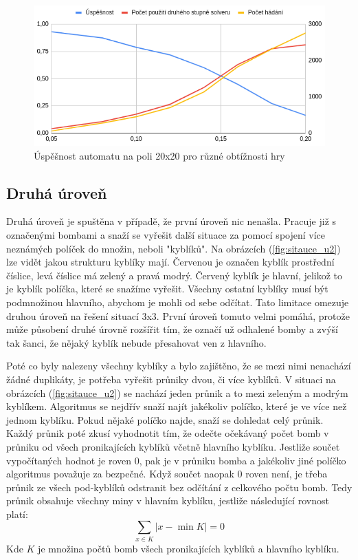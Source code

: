 \begin{figure}[ht!]
    \centering
    \includegraphics[scale=0.60]{images/uspesnost.png}
    \caption{Úspěšnost automatu na poli 20x20 pro různé obtížnosti hry}
    \label{fig:uspesnost}
\end{figure}

\subsection{Druhá úroveň}
Druhá úroveň je spuštěna v případě, že první úroveň nic nenašla. Pracuje již s označenými bombami a snaží se vyřešit další
situace za pomocí spojení více neznámých políček do množin, neboli "kyblíků". Na obrázcích (\ref{fig:sitauce_u2}) lze vidět jakou
strukturu kyblíky mají. Červenou je označen kyblík prostřední číslice, levá číslice má zelený a pravá modrý. Červený kyblík je
hlavní, jelikož to je kyblík políčka, které se snažíme vyřešit. Všechny ostatní kyblíky musí být podmnožinou hlavního, abychom je
mohli od sebe odčítat. Tato limitace omezuje druhou úroveň na řešení situací 3x3. První úroveň tomuto velmi pomáhá, protože může
působení druhé úrovně rozšířit tím, že označí už odhalené bomby a zvýší tak šanci, že nějaký kyblík nebude přesahovat ven z
hlavního.

Poté co byly nalezeny všechny kyblíky a bylo zajištěno, že se mezi nimi nenachází žádné duplikáty, je potřeba vyřešit průniky
dvou, či více kyblíků. V situaci na obrázcích (\ref{fig:sitauce_u2}) se nachází jeden průnik a to mezi zeleným a modrým kyblíkem.
Algoritmus se nejdřív snaží najít jakékoliv políčko, které je ve více než jednom kyblíku. Pokud nějaké políčko najde, snaží se
dohledat celý průnik. Každý průnik poté zkusí vyhodnotit tím, že odečte očekávaný počet bomb v průniku od všech pronikajících
kyblíků včetně hlavního kyblíku. Jestliže součet vypočítaných hodnot je roven $0$, pak je v průniku bomba a jakékoliv jiné
políčko algoritmus považuje za bezpečné. Když součet naopak $0$ roven není, je třeba průnik ze všech pod-kyblíků odstranit bez
odčítání z celkového počtu bomb. Tedy průnik obsahuje všechny miny v hlavním kyblíku, jestliže následující rovnost platí:
\begin{equation*}
\sum_{x \in K} |x-\min K| = 0
\end{equation*}
Kde $K$ je množina počtů bomb všech pronikajících kyblíků a hlavního kyblíku.

